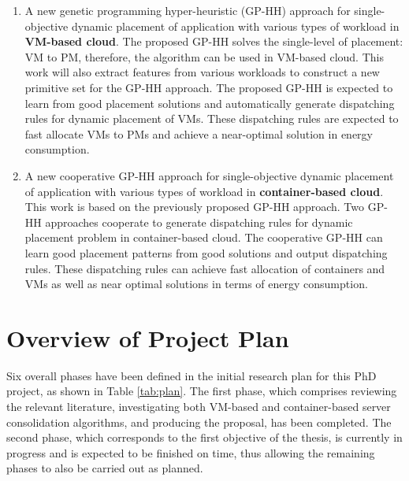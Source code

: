 \begin{enumerate}
	\item A new genetic programming hyper-heuristic (GP-HH) approach for single-objective dynamic placement of application with various types of workload in \textbf{VM-based cloud}. The proposed GP-HH solves the single-level of placement: VM to PM, therefore, the algorithm can be used in VM-based cloud. This work will also extract features from various workloads to construct a new primitive set for the GP-HH approach. The proposed GP-HH is expected to learn from good placement solutions and automatically generate dispatching rules for dynamic placement of VMs. These dispatching rules are expected to fast allocate VMs to PMs and achieve a near-optimal solution in energy consumption.

	\item A new cooperative GP-HH approach for single-objective dynamic placement of application with various types of workload in \textbf{container-based cloud}. This work is based on the previously proposed GP-HH approach. Two GP-HH approaches cooperate to generate dispatching rules for dynamic placement problem in container-based cloud.  The cooperative GP-HH can learn good placement patterns from good solutions and output dispatching rules. These dispatching rules can achieve fast allocation of containers and VMs as well as near optimal solutions in terms of energy consumption.
\end{enumerate}

\section{Overview of Project Plan}
Six overall phases have been defined in the initial research plan for this PhD project, as
shown in Table \ref{tab:plan}. The first phase, which comprises reviewing the relevant literature, investigating both VM-based and container-based server consolidation algorithms, and producing the proposal, has
been completed. The second phase, which corresponds to the first objective of the thesis, is
currently in progress and is expected to be finished on time, thus allowing the remaining
phases to also be carried out as planned.


